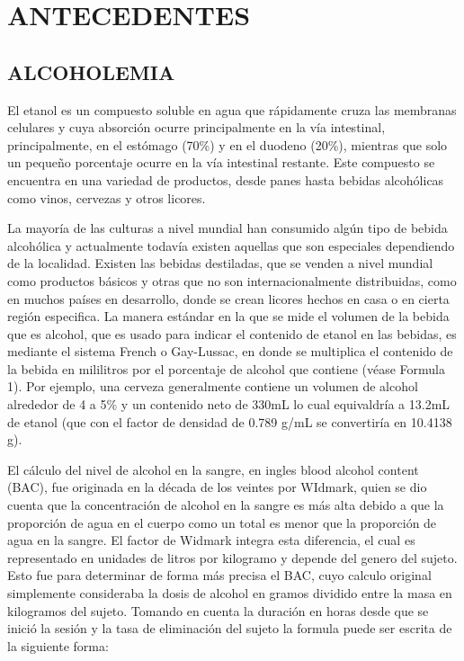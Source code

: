 \section{ANTECEDENTES}
\subsection{ALCOHOLEMIA}
El etanol es un compuesto soluble en agua que rápidamente cruza las membranas celulares y cuya absorción ocurre principalmente en la vía intestinal, principalmente, en el estómago (70\%) y en el duodeno (20\%), mientras que solo un pequeño porcentaje ocurre en la vía intestinal restante. Este compuesto se encuentra en una variedad de productos, desde panes hasta bebidas alcohólicas como vinos, cervezas y otros licores. \cite{acute_alcohol} \par
La mayoría de las culturas a nivel mundial han consumido algún tipo de bebida alcohólica y actualmente todavía existen aquellas que son especiales dependiendo de la localidad. Existen las bebidas destiladas, que se venden a nivel mundial como productos básicos y otras que no son internacionalmente distribuidas, como en muchos países en desarrollo, donde se crean licores hechos en casa o en cierta región especifica. La manera estándar en la que se mide el volumen de la bebida que es alcohol, que es usado para indicar el contenido de etanol en las bebidas, es mediante el sistema French o Gay-Lussac, en donde se multiplica el contenido de la bebida en mililitros por el porcentaje de alcohol que contiene (véase Formula 1). Por ejemplo, una cerveza generalmente contiene un volumen de alcohol alrededor de 4 a 5\% y un contenido neto de 330mL lo cual equivaldría a 13.2mL de etanol (que con el factor de densidad de 0.789 g/mL se convertiría en 10.4138 g).\par
El cálculo del nivel de alcohol en la sangre, en ingles blood alcohol content (BAC), fue originada en la década de los veintes por WIdmark, quien se dio cuenta que la concentración de alcohol en la sangre es más alta debido a que la proporción de agua en el cuerpo como un total es menor que la proporción de agua en la sangre. El factor de Widmark integra esta diferencia, el cual es representado en unidades de litros por kilogramo y depende del genero del sujeto. Esto fue para determinar de forma más precisa el BAC, cuyo calculo original simplemente consideraba la dosis de alcohol en gramos dividido entre la masa en kilogramos del sujeto. Tomando en cuenta la duración en horas desde que se inició la sesión y la tasa de eliminación del sujeto la formula puede ser escrita de la siguiente forma:\par
